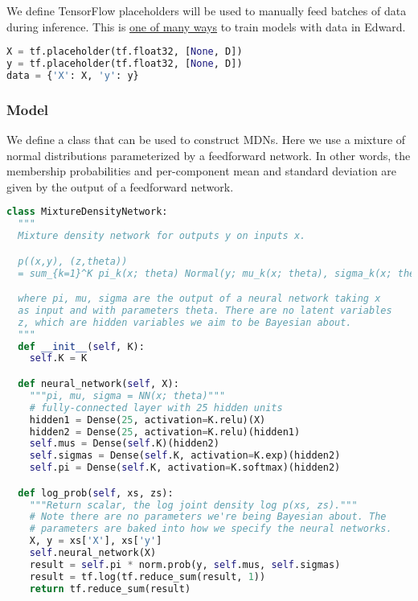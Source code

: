 We define TensorFlow placeholders will be used to manually feed batches of data during inference. This is \href{http://edwardlib.org/api/data}{one of many ways} to train models with data in Edward.

\begin{lstlisting}[language=Python]
X = tf.placeholder(tf.float32, [None, D])
y = tf.placeholder(tf.float32, [None, D])
data = {'X': X, 'y': y}
\end{lstlisting}


\subsubsection{Model}

We define a class that can be used to construct MDNs. Here we use a
mixture of normal distributions parameterized by a feedforward
network. In other words, the membership probabilities and
per-component mean and standard deviation are given by the output of a
feedforward network.

\begin{lstlisting}[language=Python]
class MixtureDensityNetwork:
  """
  Mixture density network for outputs y on inputs x.

  p((x,y), (z,theta))
  = sum_{k=1}^K pi_k(x; theta) Normal(y; mu_k(x; theta), sigma_k(x; theta))

  where pi, mu, sigma are the output of a neural network taking x
  as input and with parameters theta. There are no latent variables
  z, which are hidden variables we aim to be Bayesian about.
  """
  def __init__(self, K):
    self.K = K

  def neural_network(self, X):
    """pi, mu, sigma = NN(x; theta)"""
    # fully-connected layer with 25 hidden units
    hidden1 = Dense(25, activation=K.relu)(X)
    hidden2 = Dense(25, activation=K.relu)(hidden1)
    self.mus = Dense(self.K)(hidden2)
    self.sigmas = Dense(self.K, activation=K.exp)(hidden2)
    self.pi = Dense(self.K, activation=K.softmax)(hidden2)

  def log_prob(self, xs, zs):
    """Return scalar, the log joint density log p(xs, zs)."""
    # Note there are no parameters we're being Bayesian about. The
    # parameters are baked into how we specify the neural networks.
    X, y = xs['X'], xs['y']
    self.neural_network(X)
    result = self.pi * norm.prob(y, self.mus, self.sigmas)
    result = tf.log(tf.reduce_sum(result, 1))
    return tf.reduce_sum(result)
\end{lstlisting}

